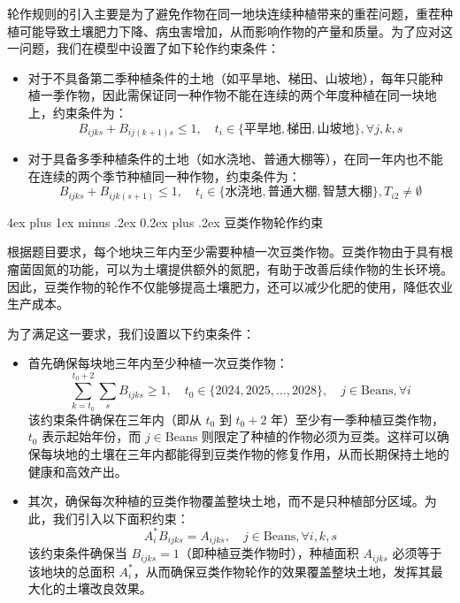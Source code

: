 \documentclass[12pt,a4paper]{nmmcm}
\makeatletter
\renewcommand\subsubsection{\@startsection{subsubsection}{3}{1em}%
  {4ex plus 1ex minus .2ex}%
  {0.2ex plus .2ex}%
  {\normalfont\large\bfseries}}
\makeatother
\begin{document}
轮作规则的引入主要是为了避免作物在同一地块连续种植带来的重茬问题，重茬种植可能导致土壤肥力下降、病虫害增加，从而影响作物的产量和质量。为了应对这一问题，我们在模型中设置了如下轮作约束条件：

\begin{itemize}
  \item 对于不具备第二季种植条件的土地（如平旱地、梯田、山坡地），每年只能种植一季作物，因此需保证同一种作物不能在连续的两个年度种植在同一块地上，约束条件为：
        \[
          B_{ijks} + B_{ij(k+1)s} \leq 1, \quad t_i \in \{\text{平旱地}, \text{梯田}, \text{山坡地}\}, \forall j, k, s
        \]

  \item 对于具备多季种植条件的土地（如水浇地、普通大棚等），在同一年内也不能在连续的两个季节种植同一种作物，约束条件为：
        \[
          B_{ijks} + B_{ijk(s+1)} \leq 1, \quad t_i \in \{\text{水浇地}, \text{普通大棚}, \text{智慧大棚}\}, T_{i2} \neq \emptyset
        \]
\end{itemize}

\subsubsection{豆类作物轮作约束}

根据题目要求，每个地块三年内至少需要种植一次豆类作物。豆类作物由于具有根瘤菌固氮的功能，可以为土壤提供额外的氮肥，有助于改善后续作物的生长环境。因此，豆类作物的轮作不仅能够提高土壤肥力，还可以减少化肥的使用，降低农业生产成本。

为了满足这一要求，我们设置以下约束条件：
\begin{itemize}
  \item 首先确保每块地三年内至少种植一次豆类作物：
        \[
          \sum_{k=t_0}^{t_0+2} \sum_s B_{ijks} \geq 1, \quad t_0 \in \{2024, 2025, \dots, 2028\}, \quad j \in \text{Beans}, \forall i
        \]
        该约束条件确保在三年内（即从 $t_0$ 到 $t_0 + 2$ 年）至少有一季种植豆类作物，$t_0$ 表示起始年份，而 $j \in \text{Beans}$ 则限定了种植的作物必须为豆类。这样可以确保每块地的土壤在三年内都能得到豆类作物的修复作用，从而长期保持土地的健康和高效产出。

  \item 其次，确保每次种植的豆类作物覆盖整块土地，而不是只种植部分区域。为此，我们引入以下面积约束：
        \[
          A_{i}^* B_{ijks} = A_{ijks}, \quad j \in \text{Beans}, \forall i,k,s
        \]
        该约束条件确保当 $B_{ijks} = 1$（即种植豆类作物时），种植面积 $A_{ijks}$ 必须等于该地块的总面积 $A_{i}^*$，从而确保豆类作物轮作的效果覆盖整块土地，发挥其最大化的土壤改良效果。
\end{itemize}
\end{document}
